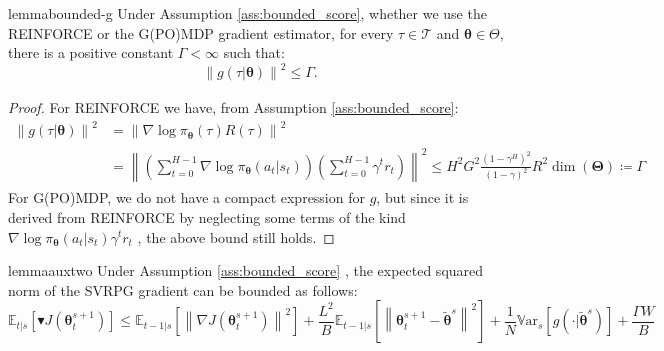 \documentclass{article}
\theoremstyle{remark}
\theoremstyle{definition}
\newcommand{\norm}[2][\infty]{\left\|#2\right\|_{#1}}
\newcommand{\vtheta}{\boldsymbol{\theta}}
\newcommand{\Tspace}{\mathcal{T}}
\newcommand{\score}[2]{\nabla\log\pi_{#1}(#2)}
\newcommand{\vTheta}{\boldsymbol{\Theta}}
\newcommand{\gradJ}[1]{\nabla J(#1)}
\newcommand{\Ets}[2][t]{\mathbb{E}_{#1\vert s}\left[#2\right]}
\newcommand{\Vars}[1]{{\mathbb{V}\text{ar}}_{s}\left[#1\right]}
\newcommand{\gradBlack}[1]{\blacktriangledown J(#1)}
\newcommand{\VARIS}{W}
\begin{document}
\begin{restatable}[]{lemma}{bounded-g}\label{lemma:gbound}
Under Assumption \ref{ass:bounded_score}, whether we use the REINFORCE or the G(PO)MDP gradient estimator, for every $\tau\in\Tspace$ and $\vtheta\in\Theta$, there is a positive constant $\Gamma<\infty$ such that:
\[
	\norm[]{g(\tau\vert\vtheta)}^2 \leq \Gamma.
\]
\end{restatable}
\begin{proof}
For REINFORCE we have, from Assumption \ref{ass:bounded_score}:
\begin{align*}
	\norm[]{g(\tau\vert\vtheta)}^2 &=
	\norm[]{\score{\vtheta}{\tau}R(\tau)}^2 \\
	&=\norm[]{\left(\sum_{t=0}^{H-1}\score{\vtheta}{a_t\vert s_t}\right)\left(\sum_{t=0}^{H-1}\gamma^t r_t\right)}^2\leq H^2G^2\frac{(1-\gamma^H)^2}{(1-\gamma)^2}R^2\dim(\vTheta) \coloneqq \Gamma
\end{align*}
For G(PO)MDP, we do not have a compact expression for $g$, but since it is derived from REINFORCE by neglecting some terms of the kind $\score{\vtheta}{a_t\vert s_t}\gamma^t r_t$ \cite{baxter2001infinite}\cite{peters2008reinforcement}, the above bound still holds.
\end{proof}
\begin{restatable}[]{lemma}{auxtwo}\label{lemma:aux2}
Under Assumption \ref{ass:bounded_score}
, the expected squared norm of the SVRPG gradient can be bounded as follows:
\[
\Ets{\gradBlack{\vtheta_t^{s+1}}} \leq
\Ets[t-1]{\norm[]{\gradJ{\vtheta_t^{s+1}}}^2} 
+\frac{L^2}{B}\Ets[t-1]{\norm[]{\vtheta_t^{s+1}-\tilde{\vtheta}^s}^2}
+\frac{1}{N}\Vars{g(\cdot\vert\tilde{\vtheta}^s)}
\nonumber 
+\frac{\Gamma\VARIS}{B}
\]
\end{restatable}
\end{document}
